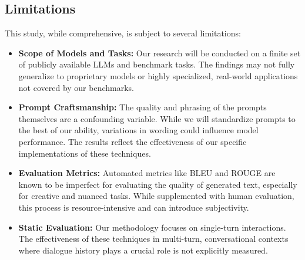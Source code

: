 \documentclass{article}
\begin{document}
\subsection{Limitations}
This study, while comprehensive, is subject to several limitations:
\begin{itemize}
    \item \textbf{Scope of Models and Tasks:} Our research will be conducted on a finite set of publicly available LLMs and benchmark tasks. The findings may not fully generalize to proprietary models or highly specialized, real-world applications not covered by our benchmarks.
    \item \textbf{Prompt Craftsmanship:} The quality and phrasing of the prompts themselves are a confounding variable. While we will standardize prompts to the best of our ability, variations in wording could influence model performance. The results reflect the effectiveness of our specific implementations of these techniques.
    \item \textbf{Evaluation Metrics:} Automated metrics like BLEU and ROUGE are known to be imperfect for evaluating the quality of generated text, especially for creative and nuanced tasks. While supplemented with human evaluation, this process is resource-intensive and can introduce subjectivity.
    \item \textbf{Static Evaluation:} Our methodology focuses on single-turn interactions. The effectiveness of these techniques in multi-turn, conversational contexts where dialogue history plays a crucial role is not explicitly measured.
\end{itemize}
\end{document}
